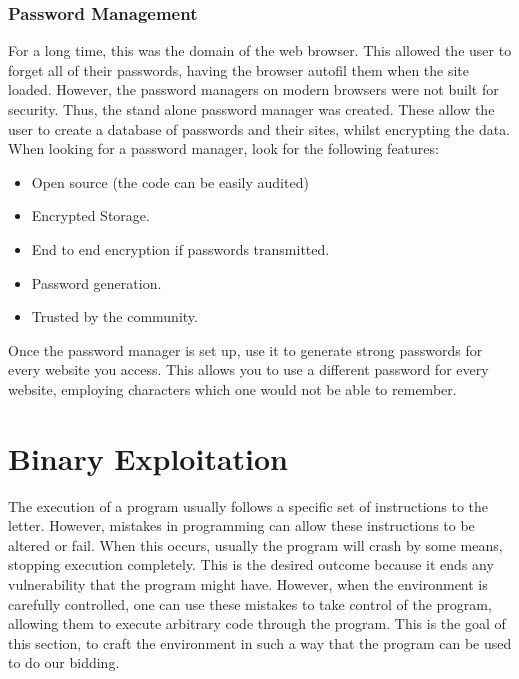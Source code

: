 \documentclass[a4paper,11pt]{report}
\begin{document}
		\subsection{Password Management}
			For a long time, this was the domain of the web browser. 
			This allowed the user to forget all of their passwords, having the browser autofil them when the site loaded.
			However, the password managers on modern browsers were not built for security. 
			Thus, the stand alone password manager was created. 
			These allow the user to create a database of passwords and their sites, whilst encrypting the data. 
			When looking for a password manager, look for the following features:
			\begin{itemize}
				\item Open source (the code can be easily audited)
				\item Encrypted Storage. 
				\item End to end encryption if passwords transmitted.
				\item Password generation. 
				\item Trusted by the community. 
			\end{itemize}
			Once the password manager is set up, use it to generate strong passwords for every website you access. 
			This allows you to use a different password for every website, employing characters which one would not be able to remember. 

\chapter{Binary Exploitation}
	\label{ch:BinaryExploitation}
		The execution of a program usually follows a specific set of instructions to the letter. 
		However, mistakes in programming can allow these instructions to be altered or fail. 
		When this occurs, usually the program will crash by some means, stopping execution completely. 
		This is the desired outcome because it ends any vulnerability that the program might have. 
		However, when the environment is carefully controlled, one can use these mistakes to take control of the program, 
		allowing them to execute arbitrary code through the program.\cite{HackingAOE} 
		This is the goal of this section, to craft the environment in such a way that the program can be used to do our bidding. 
\end{document}
